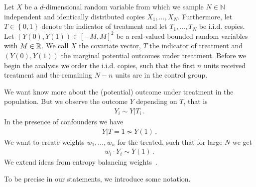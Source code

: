 Let $X$ be a $d$-dimensional random variable from which we sample
$N\in\mathbb{N}$ independent and identically distributed copies
$X_1,\ldots,X_N$. Furthermore, let $T\in \left\{ 0,1 \right\}$ 
denote the indicator of treatment and let $T_1,\ldots,T_N$ be i.i.d. 
copies.
Let $(Y(0),Y(1))\in[-M,M]^2$ be a real-valued bounded random variables with 
$M\in\mathbb{R}$.
We call $X$ the covariate vector, $T$ the indicator of treatment
and
$
(Y(0),Y(1))
$
the marginal potential outcomes under treatment.
Before we begin the analysis we order the i.i.d. copies, such that
the first $n$ units received treatment and the remaining $N-n$ units 
are in the control group.

We want know more about the (potential) outcome under treatment 
in the population.
But we observe the outcome $Y$ depending on $T$,
that is
\begin{gather}
  Y_i \sim Y|T_i
  \,.
\end{gather}
In the presence of confounders we have
\begin{gather}
  Y|T=1 \nsim Y(1)
  \,.
\end{gather}
We want to create weights
$w_1,\ldots,w_n$ for the treated, such that for large $N$ we get
\begin{gather}
  w_i \cdot Y_i \sim Y(1)
  \,.
\end{gather}
We extend ideas from entropy balancing weights~\cite{Wang2019}.

To be precise in our statements, we introduce some notation.
